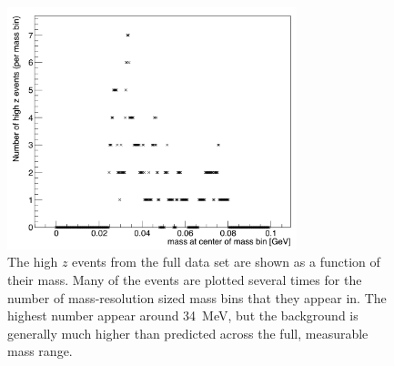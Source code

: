 \begin{figure}[htb]
  \centering
      \includegraphics[width=0.75\textwidth]{pics/results/highz_v_mass.png}
  \caption[High $z$ events as a function of mass]{The high $z$ events from the full data set are shown as a function of their mass. Many of the events are plotted several times for the number of mass-resolution sized mass bins that they appear in. The highest number appear around 34~MeV, but the background is generally much higher than predicted across the full, measurable mass range.}
  \label{fig:highz_mass}
\end{figure} 

